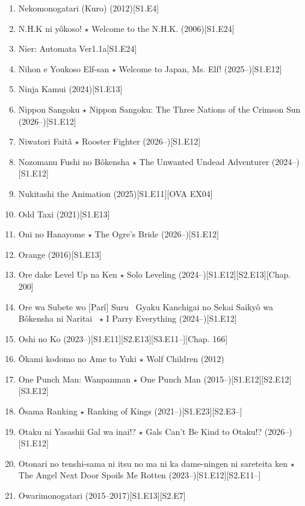\documentclass{article}
\begin{document}
\begin{enumerate}
    {\sf Comment.} Good happy ending.
    \item {\sc Nekomonogatari (Kuro)} (2012)[S1.E4]
    \item {\sc N.H.K ni yôkoso! $\star$ Welcome to the N.H.K.} (2006)\hfill[S1.E24]
    \item {\sc Nier: Automata Ver1.1a}\hfill[S1.E24]
    \item {\sc Nihon e Youkoso Elf-san $\star$ Welcome to Japan, Ms. Elf!} (2025--)\hfill[S1.E12]
    \item {\sc Ninja Kamui} (2024)\hfill[S1.E13]
    \item {\sc Nippon Sangoku $\star$ Nippon Sangoku: The Three Nations of the Crimson Sun} (2026--)\hfill[S1.E12]
    \item {\sc Niwatori Faitâ $\star$ Rooster Fighter} (2026--)\hfill[S1.E12]
    \item {\sc Nozomanu Fushi no Bôkensha $\star$ The Unwanted Undead Adventurer} (2024--)\hfill[S1.E12]
    \item {\sc Nukitashi the Animation} (2025)\hfill[S1.E11][OVA EX04]
    \item {\sc Odd Taxi} (2021)\hfill[S1.E13]
    \item {\sc Oni no Hanayome $\star$ The Ogre's Bride} (2026--)\hfill[S1.E12]
    \item {\sc Orange} (2016)\hfill[S1.E13]
    \item {\sc Ore dake Level Up na Ken $\star$ Solo Leveling} (2024--)\hfill[S1.E12][S2.E13][Chap. 200]
    \item {\sc Ore wa Subete wo [Parî] Suru ~Gyaku Kanchigai no Sekai Saikyô wa Bôkensha ni Naritai~ $\star$ I Parry Everything} (2024--)\hfill[S1.E12]
    \item {\sc Oshi no Ko} (2023--)\hfill[S1.E11][S2.E13][S3.E11--][Chap. 166]
    \item {\sc\^Okami kodomo no Ame to Yuki $\star$ Wolf Children} (2012)
    \item One Punch Man: Wanpanman $\star$ One Punch Man (2015--)\hfill[S1.E12][S2.E12][S3.E12]
    \item {\sc\^Osama Ranking $\star$ Ranking of Kings} (2021--)\hfill[S1.E23][S2.E3--]
    \item {\sc Otaku ni Yasashii Gal wa inai!? $\star$ Gals Can't Be Kind to Otaku!?} (2026--)\hfill[S1.E12]
    \item Otonari no tenshi-sama ni itsu no ma ni ka dame-ningen ni sareteita ken $\star$ The Angel Next Door Spoils Me Rotten (2023--)\hfill[S1.E12][S2.E11--]
    \item {\sc Owarimonogatari} (2015--2017)\hfill[S1.E13][S2.E7]

\end{enumerate}
\end{document}
